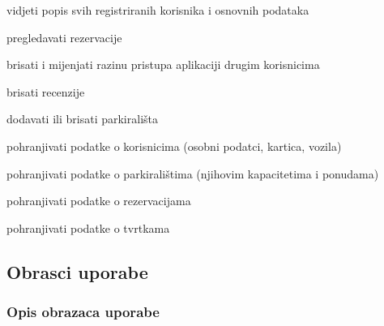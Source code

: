 \begin{packed_enum}
\begin{packed_enum}
	\end{packed_enum}
	
	\item {}
	
	\begin{packed_enum}
		
		\item vidjeti popis svih registriranih korisnika i osnovnih podataka
		\item pregledavati rezervacije
		\item brisati i mijenjati razinu pristupa aplikaciji drugim korisnicima
		\item brisati recenzije
		\item dodavati ili brisati parkirališta
		
	\end{packed_enum}
	
	\item {}
	
	\begin{packed_enum}
		
		\item pohranjivati podatke o korisnicima (osobni podatci, kartica, vozila)
		\item pohranjivati podatke o parkiralištima (njihovim kapacitetima i ponudama)
		\item pohranjivati podatke o rezervacijama
		\item pohranjivati podatke o tvrtkama
		
	\end{packed_enum}
\end{packed_enum}


\eject 



\subsection{Obrasci uporabe}

\subsubsection{Opis obrazaca uporabe}

